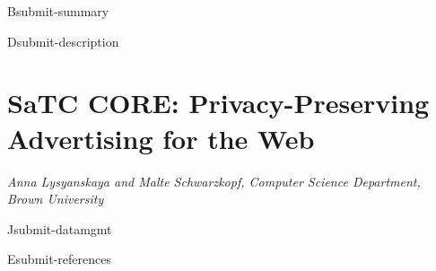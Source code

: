 \documentclass[11pt]{article}
\newcommand{\proptitle}{Privacy-Preserving Advertising for the Web}
\newcommand{\authoraffil}{Anna Lysyanskaya and Malte Schwarzkopf, Computer Science Department, Brown University}
\begin{document}
\pagestyle{plain}

\begin{submit}{B}{submit-summary}

\end{submit}


\begin{submit}{D}{submit-description}

\section*{SaTC CORE: \proptitle{}}
{\em\authoraffil}
\medskip




%
%
%


\end{submit}

%

\begin{submit}{J}{submit-datamgmt}

\end{submit}

%

%

%

\begin{submit}{E}{submit-references}
{

\renewcommand{\refname}{{E}\quad References Cited}
\raggedright
%
%
\printbibliography

}
\end{submit}
\end{document}
